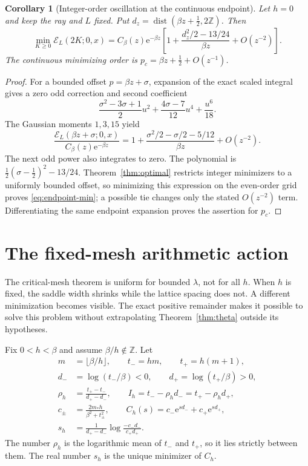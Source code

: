 \documentclass[11pt,a4paper]{article}
\numberwithin{equation}{section}
\newtheorem{corollary}[theorem]{Corollary}
\theoremstyle{definition}\newtheorem{definition}[theorem]{Definition}
\theoremstyle{remark}\newtheorem{remark}[theorem]{Remark}
\newcommand{\e}{\mathrm e}
\newcommand{\Z}{\mathbb Z}
\newcommand{\mstar}{m_*}
\newcommand{\calE}{\mathcal E}
\DeclareMathOperator{\dist}{dist}
\begin{document}
\begin{corollary}[Integer-order oscillation at the continuous endpoint]
\label{cor:endpoint}
Let $h=0$ and keep the ray and $L$ fixed. Put
$d_z=\dist(\beta z+\tfrac12,2\Z)$. Then
\begin{equation}
 \min_{K\ge0}\calE_L(2K;0,x)
 =C_\beta(z)\e^{-\beta z}
 \left[1+\frac{d_z^2/2-13/24}{\beta z}+O(z^{-2})\right].
 \label{eq:endpoint-min}
\end{equation}
The continuous minimizing order is
$p_c=\beta z+\tfrac12+O(z^{-1})$.
\end{corollary}
\begin{proof}
For a bounded offset $p=\beta z+\sigma$, expansion of the exact scaled
integral gives a zero odd correction and second coefficient
\[
 \frac{\sigma^2-3\sigma+1}{2}u^2
 +\frac{4\sigma-7}{12}u^4+\frac{u^6}{18}.
\]
The Gaussian moments $1,3,15$ yield
\begin{equation}
 \frac{\calE_L(\beta z+\sigma;0,x)}{C_\beta(z)\e^{-\beta z}}
 =1+\frac{\sigma^2/2-\sigma/2-5/12}{\beta z}+O(z^{-2}).
 \label{eq:endpoint-offset}
\end{equation}
The next odd power also integrates to zero. The polynomial is
$\tfrac12(\sigma-\tfrac12)^2-13/24$. Theorem~\ref{thm:optimal} restricts
integer minimizers to a uniformly bounded offset, so minimizing this
expression on the even-order grid proves \eqref{eq:endpoint-min}; a
possible tie changes only the stated $O(z^{-2})$ term. Differentiating the
same endpoint expansion proves the assertion for $p_c$.
\end{proof}

\section{The fixed-mesh arithmetic action}
\label{sec:fixed}

The critical-mesh theorem is uniform for bounded $\lambda$, not for all
$h$. When $h$ is fixed, the saddle width shrinks while the lattice spacing
does not. A different minimization becomes visible. The exact positive
remainder makes it possible to solve this problem without extrapolating
Theorem~\ref{thm:theta} outside its hypotheses.

Fix $0<h<\beta$ and assume $\beta/h\notin\Z$. Let
\begin{align}
 m&=\lfloor\beta/h\rfloor,\qquad t_-=hm,\qquad t_+=h(m+1),\\
 d_-&=\log(t_-/\beta)<0,\qquad d_+=\log(t_+/\beta)>0,\\
 \rho_h&=\frac{t_+-t_-}{d_+-d_-},\qquad
 I_h=t_--\rho_h d_-=t_+-\rho_h d_+,\label{eq:action}\\
 c_\pm&=\frac{2\mstar h}{\beta^2+t_\pm^2},\qquad
 C_h(s)=c_-\e^{sd_-}+c_+\e^{sd_+},\label{eq:Cfixed}\\
 s_h&=\frac{1}{d_+-d_-}
            \log\frac{-c_-d_-}{c_+d_+}.
 \label{eq:sh}
\end{align}
The number $\rho_h$ is the logarithmic mean of $t_-$ and $t_+$, so it lies
strictly between them. The real number $s_h$ is the unique minimizer of
$C_h$.
\end{document}
